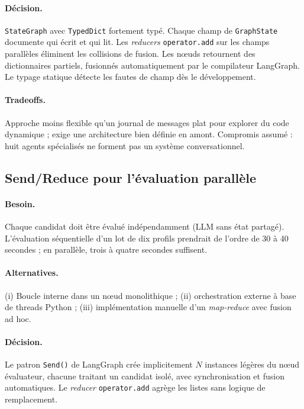 \paragraph{Décision.} \texttt{StateGraph} avec \texttt{TypedDict} fortement typé. Chaque champ de \texttt{GraphState} documente qui écrit et qui lit. Les \textit{reducers} \texttt{operator.add} sur les champs parallèles éliminent les collisions de fusion. Les nœuds retournent des dictionnaires partiels, fusionnés automatiquement par le compilateur LangGraph. Le typage statique détecte les fautes de champ dès le développement.

\paragraph{Tradeoffs.} Approche moins flexible qu'un journal de messages plat pour explorer du code dynamique ; exige une architecture bien définie en amont. Compromis assumé : huit agents spécialisés ne forment pas un système conversationnel.

\subsection{Send/Reduce pour l'évaluation parallèle}

\paragraph{Besoin.} Chaque candidat doit être évalué indépendamment (LLM sans état partagé). L'évaluation séquentielle d'un lot de dix profils prendrait de l'ordre de 30 à 40 secondes ; en parallèle, trois à quatre secondes suffisent.

\paragraph{Alternatives.} (i) Boucle interne dans un nœud monolithique ; (ii) orchestration externe à base de threads Python ; (iii) implémentation manuelle d'un \textit{map-reduce} avec fusion ad hoc.

\paragraph{Décision.} Le patron \texttt{Send()} de LangGraph crée implicitement $N$ instances légères du nœud évaluateur, chacune traitant un candidat isolé, avec synchronisation et fusion automatiques. Le \textit{reducer} \texttt{operator.add} agrège les listes sans logique de remplacement.

